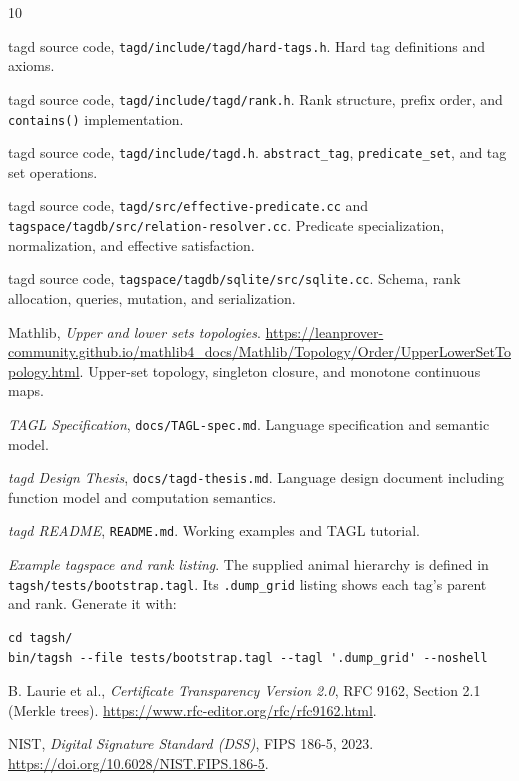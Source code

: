\documentclass{article}
\begin{document}
\begingroup
\small
\begin{thebibliography}{10}

tagd source code, \texttt{tagd/include/tagd/hard-tags.h}.
Hard tag definitions and axioms.

tagd source code, \texttt{tagd/include/tagd/rank.h}.
Rank structure, prefix order, and \texttt{contains()} implementation.

tagd source code, \texttt{tagd/include/tagd.h}.
\texttt{abstract\_tag}, \texttt{predicate\_set}, and tag set operations.

tagd source code, \texttt{tagd/src/effective-predicate.cc} and
\texttt{tagspace/tagdb/src/relation-resolver.cc}.
Predicate specialization, normalization, and effective satisfaction.

tagd source code, \texttt{tagspace/tagdb/sqlite/src/sqlite.cc}.
Schema, rank allocation, queries, mutation, and serialization.

Mathlib, \textit{Upper and lower sets topologies}.
\url{https://leanprover-community.github.io/mathlib4_docs/Mathlib/Topology/Order/UpperLowerSetTopology.html}.
Upper-set topology, singleton closure, and monotone continuous maps.

\textit{TAGL Specification}, \texttt{docs/TAGL-spec.md}.
Language specification and semantic model.

\textit{tagd Design Thesis}, \texttt{docs/tagd-thesis.md}.
Language design document including function model and computation semantics.

\textit{tagd README}, \texttt{README.md}.
Working examples and TAGL tutorial.

\textit{Example tagspace and rank listing}.
The supplied animal hierarchy is defined in
\texttt{tagsh/tests/bootstrap.tagl}. Its \texttt{.dump\_grid} listing
shows each tag's parent and rank. Generate it with:
\begin{lstlisting}[basicstyle=\ttfamily\small,breaklines=true]
cd tagsh/
bin/tagsh --file tests/bootstrap.tagl --tagl '.dump_grid' --noshell
\end{lstlisting}

B. Laurie et al., \textit{Certificate Transparency Version 2.0}, RFC 9162,
Section 2.1 (Merkle trees).
\url{https://www.rfc-editor.org/rfc/rfc9162.html}.

NIST, \textit{Digital Signature Standard (DSS)}, FIPS 186-5, 2023.
\url{https://doi.org/10.6028/NIST.FIPS.186-5}.


\end{thebibliography}
\end{document}
